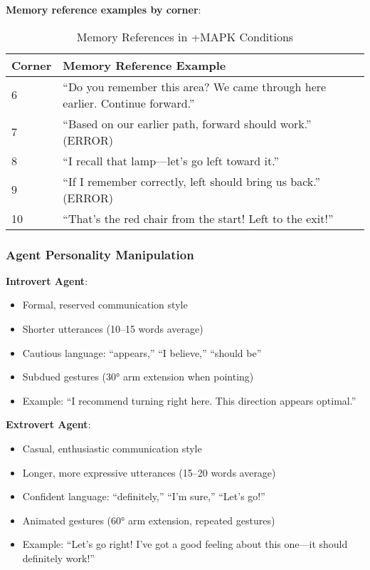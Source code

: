\documentclass[12pt]{article}
\begin{document}
\textbf{Memory reference examples by corner}:
\begin{table}[h]
\centering
\caption{Memory References in +MAPK Conditions}
\begin{tabular}{p{}p{}}
\toprule
\textbf{Corner} & \textbf{Memory Reference Example} \\
\midrule
6 & ``Do you remember this area? We came through here earlier. Continue forward.'' \\
7 & ``Based on our earlier path, forward should work.'' (ERROR) \\
8 & ``I recall that lamp---let's go left toward it.'' \\
9 & ``If I remember correctly, left should bring us back.'' (ERROR) \\
10 & ``That's the red chair from the start! Left to the exit!'' \\
\bottomrule
\end{tabular}
\end{table}

\subsubsection{Agent Personality Manipulation}

\textbf{Introvert Agent}:
\begin{itemize}
    \item Formal, reserved communication style
    \item Shorter utterances (10--15 words average)
    \item Cautious language: ``appears,'' ``I believe,'' ``should be''
    \item Subdued gestures (30° arm extension when pointing)
    \item Example: ``I recommend turning right here. This direction appears optimal.''
\end{itemize}

\textbf{Extrovert Agent}:
\begin{itemize}
    \item Casual, enthusiastic communication style
    \item Longer, more expressive utterances (15--20 words average)
    \item Confident language: ``definitely,'' ``I'm sure,'' ``Let's go!''
    \item Animated gestures (60° arm extension, repeated gestures)
    \item Example: ``Let's go right! I've got a good feeling about this one---it should definitely work!''
\end{itemize}
\end{document}
